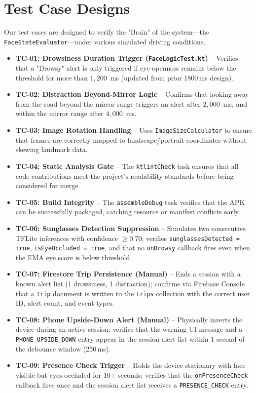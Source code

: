 \documentclass[11pt]{report}
\begin{document}
\section{Test Case Designs}  %

Our test cases are designed to verify the "Brain" of the system—the \texttt{FaceStateEvaluator}—under various simulated driving conditions.

\begin{itemize}
    \item \textbf{TC-01: Drowsiness Duration Trigger (\texttt{FaceLogicTest.kt})} – Verifies that a "Drowsy" alert is only triggered if eye-openness remains below the threshold for more than $1{,}200$~ms (updated from prior 1800\,ms design).
    \item \textbf{TC-02: Distraction Beyond-Mirror Logic} – Confirms that looking away from the road beyond the mirror range triggers an alert after $2{,}000$~ms, and within the mirror range after $4{,}000$~ms.
    \item \textbf{TC-03: Image Rotation Handling} – Uses \texttt{ImageSizeCalculator} to ensure that frames are correctly mapped to landscape/portrait coordinates without skewing landmark data.
    \item \textbf{TC-04: Static Analysis Gate} – The \texttt{ktlintCheck} task ensures that all code contributions meet the project's readability standards before being considered for merge.
    \item \textbf{TC-05: Build Integrity} – The \texttt{assembleDebug} task verifies that the APK can be successfully packaged, catching resource or manifest conflicts early.
    \item \textbf{TC-06: Sunglasses Detection Suppression} – Simulates two consecutive TFLite inferences with confidence $\geq 0.70$; verifies \texttt{sunglassesDetected = true}, \texttt{isEyeOccluded = true}, and that no \texttt{onDrowsy} callback fires even when the EMA eye score is below threshold.
    \item \textbf{TC-07: Firestore Trip Persistence (Manual)} – Ends a session with a known alert list (1 drowsiness, 1 distraction); confirms via Firebase Console that a \texttt{Trip} document is written to the \texttt{trips} collection with the correct user ID, alert count, and event types.
    \item \textbf{TC-08: Phone Upside-Down Alert (Manual)} – Physically inverts the device during an active session; verifies that the warning UI message and a \texttt{PHONE\_UPSIDE\_DOWN} entry appear in the session alert list within 1 second of the debounce window (250\,ms).
    \item \textbf{TC-09: Presence Check Trigger} – Holds the device stationary with face visible but eyes occluded for 10+ seconds; verifies that the \texttt{onPresenceCheck} callback fires once and the session alert list receives a \texttt{PRESENCE\_CHECK} entry.
\end{itemize}
\end{document}
